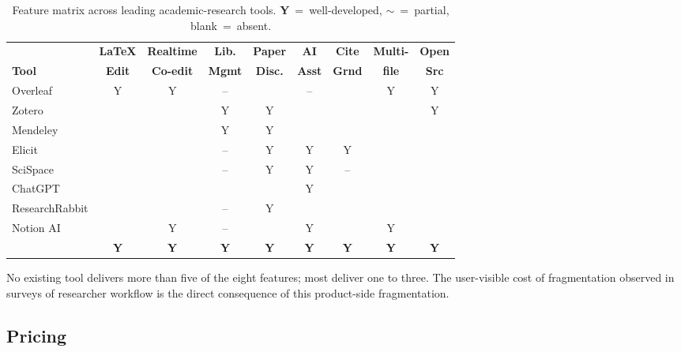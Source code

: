 \begin{table}[h]
\centering
\caption{Feature matrix across leading academic-research tools. \textbf{Y}~=~well-developed, \textbf{$\sim$}~=~partial, blank~=~absent.}
\label{tab:feature-matrix}
\scriptsize
\setlength{\tabcolsep}{4pt}
\begin{tabular}{lcccccccc}
\toprule
                                  & \textbf{LaTeX} & \textbf{Realtime} & \textbf{Lib.} & \textbf{Paper} & \textbf{AI}  & \textbf{Cite} & \textbf{Multi-} & \textbf{Open} \\
\textbf{Tool}                     & \textbf{Edit}  & \textbf{Co-edit}  & \textbf{Mgmt} & \textbf{Disc.} & \textbf{Asst}& \textbf{Grnd} & \textbf{file}    & \textbf{Src}  \\
\midrule
Overleaf            & Y    & Y    & --   &      & --   &      & Y    & Y    \\
Zotero              &      &      & Y    & Y    &      &      &      & Y    \\
Mendeley            &      &      & Y    & Y    &      &      &      &      \\
Elicit              &      &      & --   & Y    & Y    & Y    &      &      \\
SciSpace            &      &      & --   & Y    & Y    & --   &      &      \\
ChatGPT             &      &      &      &      & Y    &      &      &      \\
ResearchRabbit      &      &      & --   & Y    &      &      &      &      \\
Notion AI           &      & Y    & --   &      & Y    &      & Y    &      \\
\midrule
\textbf{\sh{}}      & \textbf{Y} & \textbf{Y} & \textbf{Y} & \textbf{Y} & \textbf{Y} & \textbf{Y} & \textbf{Y} & \textbf{Y} \\
\bottomrule
\end{tabular}
\end{table}

No existing tool delivers more than five of the eight features; most deliver one to three. The user-visible cost of fragmentation observed in surveys of researcher workflow \cite{khalifa2024aiwriting,springer2024fragmentation} is the direct consequence of this product-side fragmentation.

\subsection{Pricing}
\label{sec:lit-pricing}

